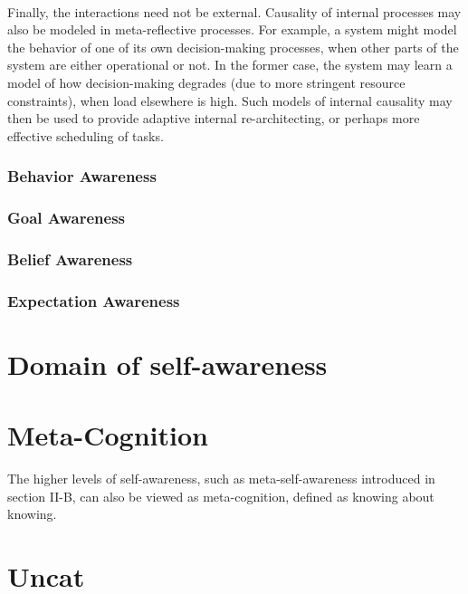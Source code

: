 \documentclass{article}
\begin{document}
					\paragraph{} Finally, the interactions need not be external. Causality of internal processes may also be modeled in meta-reflective processes. For example, a system might model the behavior of one of its own decision-making processes, when other parts of the system are either operational or not. In the former case, the system may learn a model
					of how decision-making degrades (due to more stringent resource constraints), when
					load elsewhere is high. Such models of internal causality may then be used to provide
					adaptive internal re-architecting, or perhaps more effective scheduling of tasks.
					
				\subsubsection{Behavior Awareness}
				\subsubsection{Goal Awareness}
				\subsubsection{Belief Awareness}
				\subsubsection{Expectation Awareness}
		\section{Domain of self-awareness} \cite{lewis-2017-towards-a-framework-for-the-levels-and-aspects-of-self-aware-computing-systems}
		
		\section{Meta-Cognition}
			The higher levels of self-awareness, such as meta-self-awareness introduced in section \citet{lewis-2011-a-survey-of-self-awareness-and-its-application-in-computing-systems}II-B, can also be viewed as
			meta-cognition, defined \citet{overschelde-2008-metacognition-knowing-about-knowing} as knowing about knowing.
		
		\section{Uncat}
\end{document}
